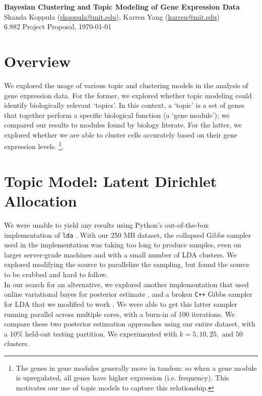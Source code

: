 \documentclass[11pt]{article}
\begin{document}
\begin{centering}
\Large
    \textbf{Bayesian Clustering and Topic Modeling of Gene Expression Data}  \\
    \vspace{2mm}
    \normalsize
    Skanda Koppula (\url{skoppula@mit.edu}), Karren Yang (\url{karren@mit.edu}) \\
    \vspace{2mm}
    \normalsize
    6.882 Project Proposal, \today \\
\end{centering}
\vspace{5mm}

\section{Overview}

We explored the usage of various topic and clustering models in the analysis of gene expression data. For the former, we explored whether topic modeling could identify biologically relevant `topics'. In this context, a `topic' is a set of genes that together perform a specific biological function (a `gene module'); we compared our results to modules found by biology literate. For the latter, we explored whether we are able to cluster cells
accurately based on their gene expression levels. \footnote{The genes in gene modules generally move in tandem: so when a gene module is upregulated, all genes have higher expression (i.e. frequency). This motivates our use of topic models to capture this relationship.}.

\section{Topic Model: Latent Dirichlet Allocation}

We were unable to yield any results using Python's out-of-the-box implementation of \texttt{lda} \cite{lda}. With our 250 MB dataset, the collapsed Gibbs sampler used in the implementation was taking too long to produce samples, even on larger server-grade machines and with a small number of LDA clusters. We explored modifying the source to parallelize the sampling, but found the source to be crabbed and hard to follow. \\

In our search for an alternative, we explored another implementation that used online variational bayes for posterior estimate \cite{ovb, online}, and a broken \texttt{C++} Gibbs sampler for LDA that we modified to work \cite{plda}. We were able to get this latter sampler running parallel across multiple cores, with a burn-in of 100 iterations. We compare these two posterior estimation approaches using our entire dataset, with a 10\% held-out testing partition. We experimented with $k=5,10,25,\text{ and } 50$ clusters.
\end{document}
